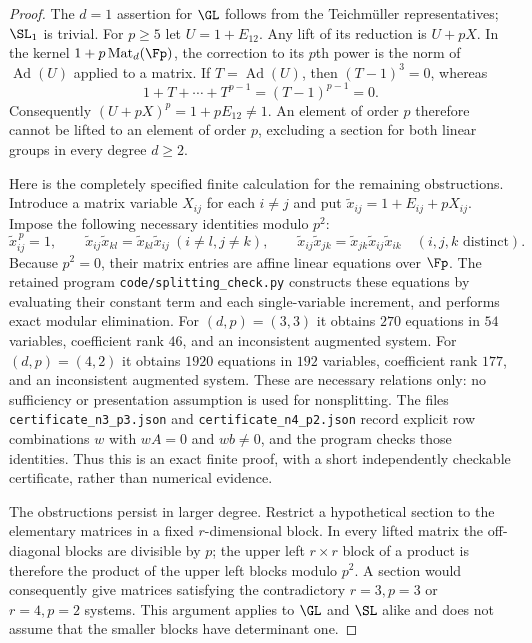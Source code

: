 \begin{proof}
The $d=1$ assertion for $\GL$ follows from the Teichm\"uller representatives; $\SL_1$ is trivial.  For $p\geq5$ let $U=1+E_{12}$.  Any lift of its reduction is $U+pX$.  In the kernel $1+p\operatorname{Mat}_d(\Fp)$, the correction to its $p$th power is the norm of $\operatorname{Ad}(U)$ applied to a matrix.  If $T=\operatorname{Ad}(U)$, then $(T-1)^3=0$, whereas
\[
 1+T+\cdots+T^{p-1}=(T-1)^{p-1}=0.
\]
Consequently $(U+pX)^p=1+pE_{12}\ne1$.  An element of order $p$ therefore cannot be lifted to an element of order $p$, excluding a section for both linear groups in every degree $d\geq2$.

Here is the completely specified finite calculation for the remaining obstructions.  Introduce a matrix variable $X_{ij}$ for each $i\ne j$ and put $\widetilde x_{ij}=1+E_{ij}+pX_{ij}$.  Impose the following necessary identities modulo $p^2$:
\[
 \widetilde x_{ij}^{\,p}=1,\qquad
 \widetilde x_{ij}\widetilde x_{kl}=\widetilde x_{kl}\widetilde x_{ij}\ (i\ne l, j\ne k),\qquad
 \widetilde x_{ij}\widetilde x_{jk}=\widetilde x_{jk}\widetilde x_{ij}\widetilde x_{ik}
 \quad(i,j,k\text{ distinct}).
\]
Because $p^2=0$, their matrix entries are affine linear equations over $\Fp$.  The retained program \texttt{code/splitting\_check.py} constructs these equations by evaluating their constant term and each single-variable increment, and performs exact modular elimination.  For $(d,p)=(3,3)$ it obtains $270$ equations in $54$ variables, coefficient rank $46$, and an inconsistent augmented system.  For $(d,p)=(4,2)$ it obtains $1920$ equations in $192$ variables, coefficient rank $177$, and an inconsistent augmented system.  These are necessary relations only: no sufficiency or presentation assumption is used for nonsplitting.  The files \texttt{certificate\_n3\_p3.json} and \texttt{certificate\_n4\_p2.json} record explicit row combinations $w$ with $wA=0$ and $wb\ne0$, and the program checks those identities.  Thus this is an exact finite proof, with a short independently checkable certificate, rather than numerical evidence.

The obstructions persist in larger degree.  Restrict a hypothetical section to the elementary matrices in a fixed $r$-dimensional block.  In every lifted matrix the off-diagonal blocks are divisible by $p$; the upper left $r\times r$ block of a product is therefore the product of the upper left blocks modulo $p^2$.  A section would consequently give matrices satisfying the contradictory $r=3,p=3$ or $r=4,p=2$ systems.  This argument applies to $\GL$ and $\SL$ alike and does not assume that the smaller blocks have determinant one.


\end{proof}
